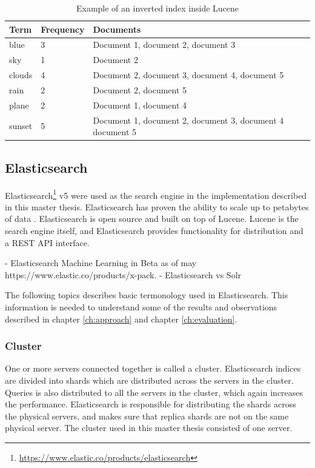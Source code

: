 \begin{table}[h]
    \centering
    \begin{tabular}{l|l|l}
    Term   & Frequency & Documents                                                 \\ \hline
    blue   & 3         & Document 1, document 2, document 3                        \\
    sky    & 1         & Document 2                                                \\
    clouds & 4         & Document 2, document 3, document 4, document 5            \\
    rain   & 2         & Document 2, document 5                                    \\
    plane  & 2         & Document 1, document 4                                    \\
    sunset & 5         & Document 1, document 2, document 3, document 4 document 5 \\
    \end{tabular}
    \caption{Example of an inverted index inside Lucene}
    \label{tbl:inverted-index}
\end{table}


\subsection{Elasticsearch}
Elasticsearch\footnote{\url{https://www.elastic.co/products/elasticsearch}} v5 were used as the search engine in the implementation described in this master thesis.
Elasticsearch has proven the ability to scale up to petabytes of data \cite{elasticsearch-scale}.
Elasticsearch is open source and built on top of Lucene.
Lucene is the search engine itself,
and Elasticsearch provides functionality for distribution and a REST API interface.

- Elasticsearch Machine Learning in Beta as of may https://www.elastic.co/products/x-pack.
- Elasticsearch vs Solr

The following topics describes basic termonology used in Elasticsearch.
This information is needed to understand some of the results and observations described in chapter \ref{ch:approach} and chapter \ref{ch:evaluation}.

\subsubsection{Cluster}
One or more servers connected together is called a cluster.
Elasticsearch indices are divided into shards which are distributed across the servers in the cluster.
Queries is also distributed to all the servers in the cluster, which again increases the performance.
Elasticsearch is responsible for distributing the shards across the physical servers,
and makes sure that replica shards are not on the same physical server.
The cluster used in this master thesis consisted of one server.

